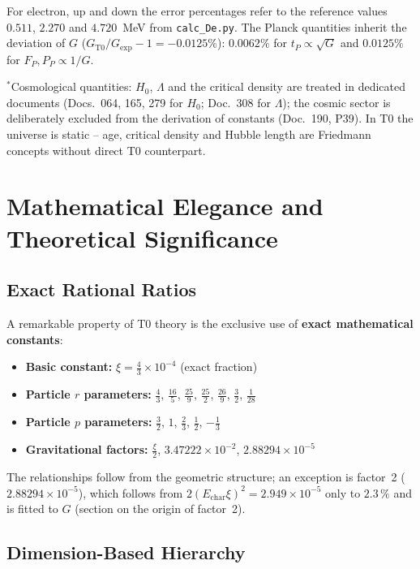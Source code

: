 	For electron, up and down the error percentages refer to the reference values $0.511$, $2.270$ and $4.720$~MeV from \texttt{calc\_De.py}. The Planck quantities inherit the deviation of $G$ ($G_{\text{T0}}/G_{\text{exp}} - 1 = -0.0125\%$): $0.0062\%$ for $t_P \propto \sqrt{G}$ and $0.0125\%$ for $F_P, P_P \propto 1/G$.
	
	{\small $^*$Cosmological quantities: $H_0$, $\Lambda$ and the critical density are treated in dedicated documents (Docs.~064, 165, 279 for $H_0$; Doc.~308 for $\Lambda$); the cosmic sector is deliberately excluded from the derivation of constants (Doc.~190, P39). In T0 the universe is static -- age, critical density and Hubble length are Friedmann concepts without direct T0 counterpart.}
	
	\section{Mathematical Elegance and Theoretical Significance}
	
	\subsection{Exact Rational Ratios}
	
	A remarkable property of T0 theory is the exclusive use of \textbf{exact mathematical constants}:
	
	\begin{itemize}
		\item \textbf{Basic constant:} $\xi = \frac{4}{3} \times 10^{-4}$ (exact fraction)
		\item \textbf{Particle $r$ parameters:} $\frac{4}{3}$, $\frac{16}{5}$, $\frac{25}{9}$, $\frac{25}{2}$, $\frac{26}{9}$, $\frac{3}{2}$, $\frac{1}{28}$
		\item \textbf{Particle $p$ parameters:} $\frac{3}{2}$, $1$, $\frac{2}{3}$, $\frac{1}{2}$, $-\frac{1}{3}$
		\item \textbf{Gravitational factors:} $\frac{\xi}{2}$, $3.47222 \times 10^{-2}$, $2.88294 \times 10^{-5}$
	\end{itemize}
	
	The relationships follow from the geometric structure; an exception is factor~2 ($2.88294\times10^{-5}$), which follows from $2(E_{\text{char}}\xi)^2 = 2.949\times10^{-5}$ only to $2.3\,\%$ and is fitted to $G$ (section on the origin of factor~2).
	
	\subsection{Dimension-Based Hierarchy}
	
